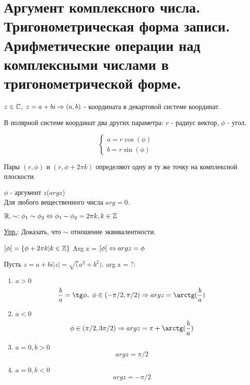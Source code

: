 \section{Аргумент комплексного числа. Тригонометрическая форма записи. Арифметические операции над комплексными числами в тригонометрической форме.}

\begin{center}
\def\svgwidth{6.0cm}

\end{center}

$z \in \mathbb{C},~z = a + bi \Rightarrow (a, b)$ - координата в декартовой системе координат.

В полярной системе координат два других параметра: $r$ - радиус вектор, $\phi$ - угол.

$$
\begin{cases}
	a = r\cos(\phi) \\
	b = r\sin(\phi)
\end{cases}
$$  

Пары $(r, \phi)$ и $(r, \phi + 2 \pi k)$ определяют одну и ту же точку на комплексной плоскости.

\begin{Def}
	$\phi$ - аргумент $z$($arg z$) \\
	\hspace*{1cm}Для любого вещественного числа $arg = 0$.
\end{Def}

$\mathbb{R}, \sim: \phi_1 \sim \phi_2 \Leftrightarrow \phi_1 - \phi_2 = 2 \pi k, k\in \mathbb{Z}$

\underline{Упр.}: Доказать, что $\sim$ отношение эквивалентности.

\begin{Def}
	$[\phi] = \{\phi + 2 \pi k | k \in \mathbb{Z}\}$
	\hspace*{1cm}Arg z = $[\phi] \Leftrightarrow arg z = \phi$
\end{Def}

Пусть $z = a + bi |z| = \sqrt(a^2 + b^2)$. arg z = ?: \\
\begin{enumerate}
	\item $a > 0$ 
	$$ \frac{b}{a} = \tg \phi,~\phi \in (-\pi/2, \pi/2) \Ra arg z = \arctg(\frac{b}{a}) $$
	\item $a < 0$ 
	$$ \phi \in (\pi/2, 3 \pi/2) \Ra arg z = \pi + \arctg(\frac{b}{a}) $$
	\item $a = 0, b > 0$
	$$ arg z = \pi/2$$
	\item $a = 0, b < 0$
	$$ arg z = -\pi/2$$
\end{enumerate}


